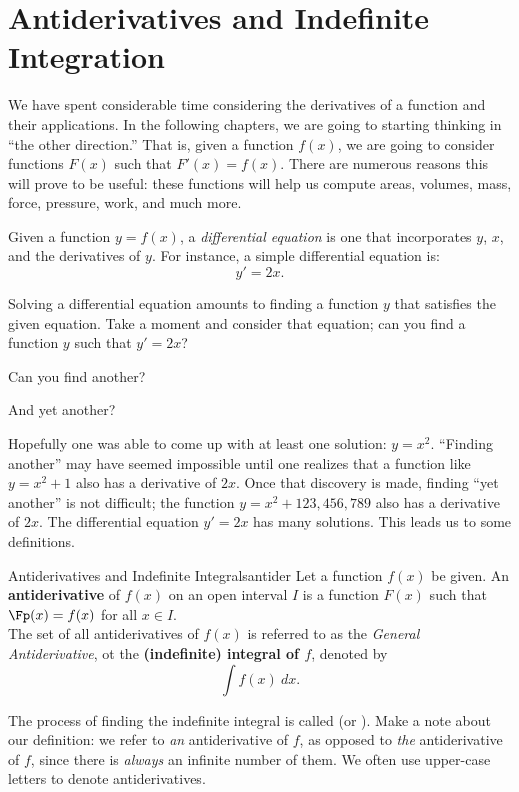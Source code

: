 \section{Antiderivatives and Indefinite Integration}\label{sec:antider}

We have spent considerable time considering the derivatives of a function and their applications. In the following chapters, we are going to starting thinking in ``the other direction.'' That is, given a function $f(x)$, we are going to consider functions $F(x)$ such that $F'(x) = f(x)$. There are numerous reasons this will prove to be useful: these functions will help us compute areas, volumes, mass, force, pressure, work, and much more.




Given a function $y=f(x)$, a \textit{differential equation} is one that incorporates $y$, $x$, and the derivatives of $y$. For instance, a simple differential equation is: $$y' = 2x.$$

Solving a differential equation amounts to finding a function $y$ that satisfies the given equation. Take a moment and consider that equation; can you find a function $y$ such that $y' = 2x$?

Can you find another?

And yet another?

Hopefully one was able to come up with at least one solution: $y = x^2$. ``Finding another'' may have seemed impossible until one realizes that a function like $y=x^2+1$ also has a derivative of $2x$. Once that discovery is made, finding ``yet another'' is not difficult; the function $y = x^2 + 123,456,789$ also has a derivative of $2x$. The differential equation $y' = 2x$ has many solutions. This leads us to some definitions.

\begin{definition}{Antiderivatives and Indefinite Integrals}{antider}
{Let a function $f(x)$ be given. An \textbf{antiderivative} of $f(x)$ on an open interval $ I $ is a function $F(x)$ such that $\Fp(x) = f(x)$ for all $ x\in I $.\\

The set of all antiderivatives of $f(x)$ is referred to as the \textit{General Antiderivative}, ot the \textbf{(indefinite) integral of $f$}, denoted by $$\int f(x) \ dx.$$
}
\end{definition}

The process of finding the indefinite integral is called  (or ).
Make a note about our definition: we refer to \textit{an} antiderivative of $f$, as opposed to \textit{the} antiderivative of $f$, since there is \textit{always} an infinite number of them. We often use upper-case letters to denote antiderivatives.

